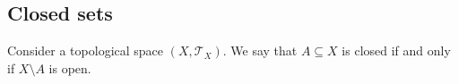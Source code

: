 \subsection{Closed sets}
Consider a topological space $(X, \mathcal T_X)$. We say that $A\subseteq X$ is closed if and only if $X\setminus A$ is open.




